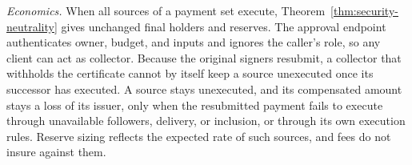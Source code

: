 \emph{Economics.} When all sources of a payment set execute,
Theorem~\ref{thm:security-neutrality} gives unchanged final holders and
reserves. The approval endpoint authenticates owner, budget, and inputs
and ignores the caller's role, so any client can act as collector.
Because the original signers resubmit, a collector that withholds the
certificate cannot by itself keep a source unexecuted once its successor
has executed. A source stays unexecuted, and its compensated amount
stays a loss of its issuer, only when the resubmitted payment fails to
execute through unavailable followers, delivery, or inclusion, or
through its own execution rules. Reserve sizing reflects the expected
rate of such sources, and fees do not insure against them.
